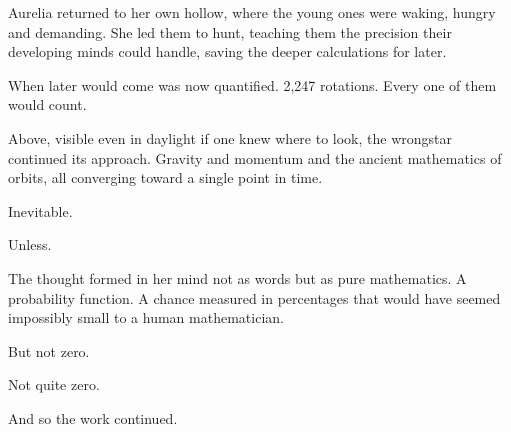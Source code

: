 Aurelia returned to her own hollow, where the young ones were waking, hungry and demanding. She led them to hunt, teaching them the precision their developing minds could handle, saving the deeper calculations for later.

When later would come was now quantified. 2,247 rotations. Every one of them would count.

Above, visible even in daylight if one knew where to look, the wrongstar continued its approach. Gravity and momentum and the ancient mathematics of orbits, all converging toward a single point in time.

Inevitable.

Unless.

The thought formed in her mind not as words but as pure mathematics. A probability function. A chance measured in percentages that would have seemed impossibly small to a human mathematician.

But not zero.

Not quite zero.

And so the work continued.

